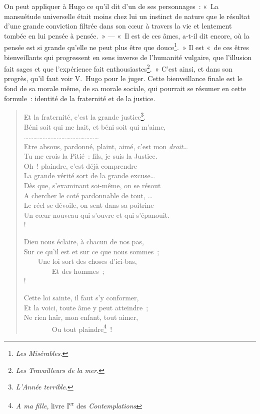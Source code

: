 \documentclass[french,twoside]{book} %
\begin{document}
\noindent On peut appliquer à Hugo ce qu’il dit d’un de ses personnages : « La mansuétude universelle était moins chez lui un instinct de nature que le résultat d’une grande conviction filtrée dans son cœur à travers la vie et lentement tombée en lui pensée à pensée. » — « Il est de ces âmes, a-t-il dit encore, où la pensée est si grande qu’elle ne peut plus être que douce\footnote{\emph{Les Misérables}.}. » Il est « de ces êtres bienveillants qui progressent en sens inverse de l’humanité vulgaire, que l’illusion fait sages et que l’expérience fait enthousiastes\footnote{\emph{Les Travailleurs de la mer}.}. » C’est ainsi, et dans son progrès, qu’il faut voir V. Hugo pour le juger. Cette bienveillance finale est le fond de sa morale même, de sa morale sociale, qui pourrait se résumer en cette formule : identité de la fraternité et de la justice.\par


\begin{verse}
Et la fraternité, c’est la grande justice\footnote{\emph{L’Année terrible}.}.\\
Béni soit qui me hait, et béni soit qui m’aime,\\
…………………………………………\\
Etre absous, pardonné, plaint, aimé, c’est mon \emph{droit}…\\
Tu me crois la Pitié : fils, je suis la Justice.\\
Oh ! plaindre, c’est déjà comprendre\\
La grande vérité sort de la grande excuse…\\
Dès que, s’examinant soi-même, on se résout\\
A chercher le coté pardonnable de tout, …\\
Le réel se dévoile, on sent dans sa poitrine\\
Un cœur nouveau qui s’ouvre et qui s’épanouit.\\!

Dieu nous éclaire, à chacun de nos pas,\\
Sur ce qu’il est et sur ce que nous sommes ;\\
    Une loi sort des choses d’ici-bas,\\
        Et des hommes ;\\!

Cette loi sainte, il faut s’y conformer,\\
Et la voici, toute âme y peut atteindre ;\\
Ne rien haïr, mon enfant, tout aimer,\\
        Ou tout plaindre\footnote{\emph{A ma fille}, livre I\textsuperscript{er} des \emph{Contemplations}} !\\
\end{verse}
\end{document}
